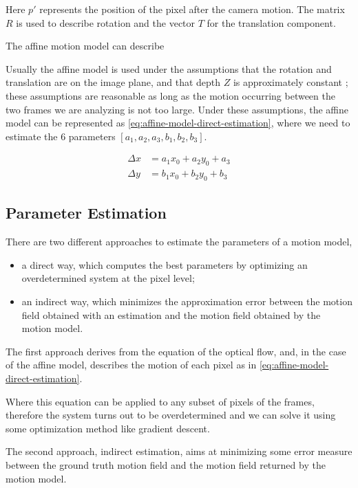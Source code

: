 Here $p'$ represents the position of the pixel after the camera motion. The matrix $R$ is used to describe rotation and the vector $T$ for the translation component.

The affine motion model can describe

Usually the affine model is used under the assumptions that the rotation and translation are on the image plane, and that depth $Z$ is approximately constant ; these assumptions are reasonable as long as the motion occurring between the two frames we are analyzing is not too large.
Under these assumptions, the affine model can be represented as \cref{eq:affine-model-direct-estimation}, where we need to estimate the 6 parameters $[a_1, a_2, a_3, b_1, b_2, b_3 ]$.

\begin{equation}
    \label{eq:affine-model-direct-estimation}
    \begin{split}
        \Delta x &= a_1 x_0 + a_2 y_0 + a_3 \\
        \Delta y &= b_1 x_0 + b_2 y_0 + b_3
    \end{split}
\end{equation}

\subsection{Parameter Estimation}
There are two different approaches to estimate the parameters of a motion model,
\begin{itemize}
    \item a direct way, which computes the best parameters by optimizing an overdetermined system at the pixel level;
    \item an indirect way, which minimizes the approximation error between the motion field obtained with an estimation and the motion field obtained by the motion model.
\end{itemize}

The first approach derives from the equation of the optical flow, and, in the case of the affine model, describes the motion of each pixel as in \cref{eq:affine-model-direct-estimation}.

Where this equation can be applied to any subset of pixels of the frames, therefore the system turns out to be overdetermined and we can solve it using some optimization method like gradient descent.

The second approach, indirect estimation, aims at minimizing some error measure between the ground truth motion field and the motion field returned by the motion model.

